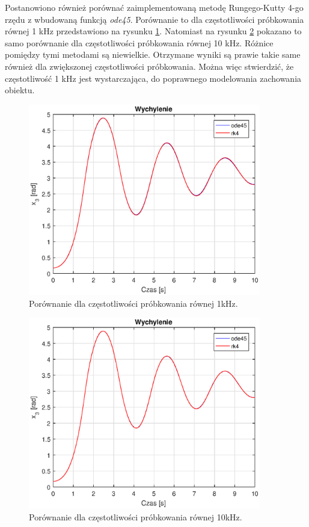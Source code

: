 Postanowiono również porównać zaimplementowaną metodę Rungego-Kutty 4-go rzędu z wbudowaną funkcją \textit{ode45}. Porównanie to dla częstotliwości próbkowania równej 1 kHz przedstawiono na rysunku \ref{fig:wychylenie_1khz}. Natomiast na rysunku \ref{fig:wychylenie_10khz} pokazano to samo porównanie dla częstotliwości próbkowania równej 10 kHz. Różnice pomiędzy tymi metodami są niewielkie. Otrzymane wyniki są prawie takie same również dla zwiększonej częstotliwości próbkowania. Można więc stwierdzić, że częstotliwość 1 kHz jest wystarczająca, do poprawnego modelowania zachowania obiektu.

\begin{figure}[h]
	\centering
	\includegraphics[width=4in]{Figures/wychylenie_1khz.eps}
	\caption{Porównanie dla częstotliwości próbkowania równej 1kHz.}
	\label{fig:wychylenie_1khz}
\end{figure}

\begin{figure}[h]
	\centering
	\includegraphics[width=4in]{Figures/wychylenie_10khz.eps}
	\caption{Porównanie dla częstotliwości próbkowania równej 10kHz.}
	\label{fig:wychylenie_10khz}
\end{figure}